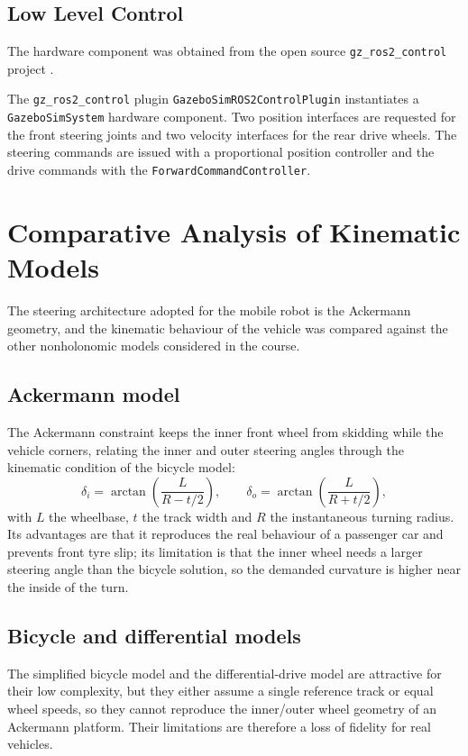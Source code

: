 \documentclass[conference]{IEEEtran}
\begin{document}
\subsection{Low Level Control}
\label{sec:control}

The hardware component was obtained from the open source \texttt{gz\_ros2\_control}
project \cite{ros2_control_gazebo}.

The \texttt{gz\_ros2\_control} plugin \texttt{GazeboSimROS2ControlPlugin}
instantiates a \texttt{GazeboSimSystem} hardware component. Two position
interfaces are requested for the front steering joints and two velocity
interfaces for the rear drive wheels. The steering commands are issued with a
proportional position controller and the drive commands with the
\texttt{ForwardCommandController}.

\section{Comparative Analysis of Kinematic Models}
\label{sec:comparative}

The steering architecture adopted for the mobile robot is the Ackermann
geometry, and the kinematic behaviour of the vehicle was compared against the
other nonholonomic models considered in the course.

\subsection{Ackermann model}
The Ackermann constraint keeps the inner front wheel from skidding while the
vehicle corners, relating the inner and outer steering angles through the
kinematic condition of the bicycle model:
\begin{equation}
  \delta_i = \arctan\left(\frac{L}{R - t/2}\right),
  \qquad
  \delta_o = \arctan\left(\frac{L}{R + t/2}\right),
  \label{eq:ackermann}
\end{equation}
with $L$ the wheelbase, $t$ the track width and $R$ the instantaneous turning
radius. Its advantages are that it reproduces the real behaviour of a passenger
car and prevents front tyre slip; its limitation is that the inner wheel needs a
larger steering angle than the bicycle solution, so the demanded curvature is
higher near the inside of the turn.

\subsection{Bicycle and differential models}
The simplified bicycle model and the differential-drive model are attractive
for their low complexity, but they either assume a single reference track or
equal wheel speeds, so they cannot reproduce the inner/outer wheel geometry of
an Ackermann platform. Their limitations are therefore a loss of fidelity for
real vehicles.
\end{document}
